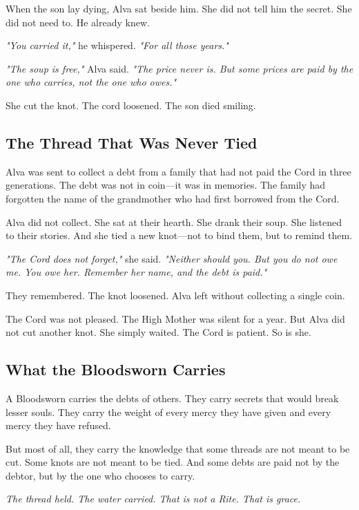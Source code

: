 When the son lay dying, Alva sat beside him. She did not tell him the secret. She did not need to. He already knew.

\textit{"You carried it,"} he whispered. \textit{"For all those years."}

\textit{"The soup is free,"} Alva said. \textit{"The price never is. But some prices are paid by the one who carries, not the one who owes."}

She cut the knot. The cord loosened. The son died smiling.

\subsection{The Thread That Was Never Tied}

Alva was sent to collect a debt from a family that had not paid the Cord in three generations. The debt was not in coin—it was in memories. The family had forgotten the name of the grandmother who had first borrowed from the Cord.

Alva did not collect. She sat at their hearth. She drank their soup. She listened to their stories. And she tied a new knot—not to bind them, but to remind them.

\textit{"The Cord does not forget,"} she said. \textit{"Neither should you. But you do not owe me. You owe her. Remember her name, and the debt is paid."}

They remembered. The knot loosened. Alva left without collecting a single coin.

The Cord was not pleased. The High Mother was silent for a year. But Alva did not cut another knot. She simply waited. The Cord is patient. So is she.

\subsection{What the Bloodsworn Carries}

A Bloodsworn carries the debts of others. They carry secrets that would break lesser souls. They carry the weight of every mercy they have given and every mercy they have refused.

But most of all, they carry the knowledge that some threads are not meant to be cut. Some knots are not meant to be tied. And some debts are paid not by the debtor, but by the one who chooses to carry.

\vspace{1em}
\begin{center}
\textit{The thread held. The water carried. That is not a Rite. That is grace.}
\end{center}

